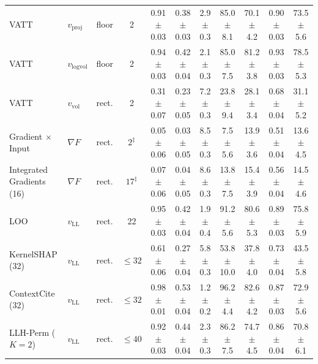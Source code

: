 \begin{table}[t]
{\begin{tabular}{lllcccccccc}
VATT & $v_{\mathrm{proj}}$ & floor & 2 & 0.91{\scriptsize$\pm$0.03} & 0.38{\scriptsize$\pm$0.03} & 2.9{\scriptsize$\pm$0.3} & 85.0{\scriptsize$\pm$8.1} & 70.1{\scriptsize$\pm$4.2} & 0.90{\scriptsize$\pm$0.03} & 73.5{\scriptsize$\pm$5.6} \\
VATT & $v_{\mathrm{logvol}}$ & floor & 2 & 0.94{\scriptsize$\pm$0.03} & 0.42{\scriptsize$\pm$0.04} & 2.1{\scriptsize$\pm$0.3} & 85.0{\scriptsize$\pm$7.5} & 81.2{\scriptsize$\pm$3.8} & 0.93{\scriptsize$\pm$0.03} & 78.5{\scriptsize$\pm$5.3} \\
VATT & $v_{\mathrm{vol}}$ & rect. & 2 & 0.31{\scriptsize$\pm$0.07} & 0.23{\scriptsize$\pm$0.05} & 7.2{\scriptsize$\pm$0.3} & 23.8{\scriptsize$\pm$9.4} & 28.1{\scriptsize$\pm$3.4} & 0.68{\scriptsize$\pm$0.04} & 31.1{\scriptsize$\pm$5.2} \\
\addlinespace[2pt]
Gradient $\times$ Input & $\nabla F$ & rect. & $2^\ddagger$ & 0.05{\scriptsize$\pm$0.06} & 0.03{\scriptsize$\pm$0.05} & 8.5{\scriptsize$\pm$0.3} & 7.5{\scriptsize$\pm$5.6} & 13.9{\scriptsize$\pm$3.6} & 0.51{\scriptsize$\pm$0.04} & 13.6{\scriptsize$\pm$4.5} \\
Integrated Gradients (16) & $\nabla F$ & rect. & $17^\ddagger$ & 0.07{\scriptsize$\pm$0.06} & 0.04{\scriptsize$\pm$0.05} & 8.6{\scriptsize$\pm$0.3} & 13.8{\scriptsize$\pm$7.5} & 15.4{\scriptsize$\pm$3.9} & 0.56{\scriptsize$\pm$0.04} & 14.5{\scriptsize$\pm$4.6} \\
LOO & $v_{\mathrm{LL}}$ & rect. & 22 & 0.95{\scriptsize$\pm$0.03} & 0.42{\scriptsize$\pm$0.04} & 1.9{\scriptsize$\pm$0.4} & 91.2{\scriptsize$\pm$5.6} & 80.6{\scriptsize$\pm$5.3} & 0.89{\scriptsize$\pm$0.03} & 75.8{\scriptsize$\pm$5.9} \\
KernelSHAP (32) & $v_{\mathrm{LL}}$ & rect. & $\le 32$ & 0.61{\scriptsize$\pm$0.06} & 0.27{\scriptsize$\pm$0.04} & 5.8{\scriptsize$\pm$0.3} & 53.8{\scriptsize$\pm$10.0} & 37.8{\scriptsize$\pm$4.0} & 0.73{\scriptsize$\pm$0.04} & 43.5{\scriptsize$\pm$5.8} \\
ContextCite (32) & $v_{\mathrm{LL}}$ & rect. & $\le 32$ & 0.98{\scriptsize$\pm$0.01} & 0.53{\scriptsize$\pm$0.04} & 1.2{\scriptsize$\pm$0.2} & 96.2{\scriptsize$\pm$4.4} & 82.6{\scriptsize$\pm$4.2} & 0.87{\scriptsize$\pm$0.03} & 72.9{\scriptsize$\pm$5.6} \\
LLH-Perm ($K=2$) & $v_{\mathrm{LL}}$ & rect. & $\le 40$ & 0.92{\scriptsize$\pm$0.03} & 0.44{\scriptsize$\pm$0.04} & 2.3{\scriptsize$\pm$0.3} & 86.2{\scriptsize$\pm$7.5} & 74.7{\scriptsize$\pm$4.5} & 0.86{\scriptsize$\pm$0.04} & 70.8{\scriptsize$\pm$6.1} \\

\end{tabular}}
\end{table}
